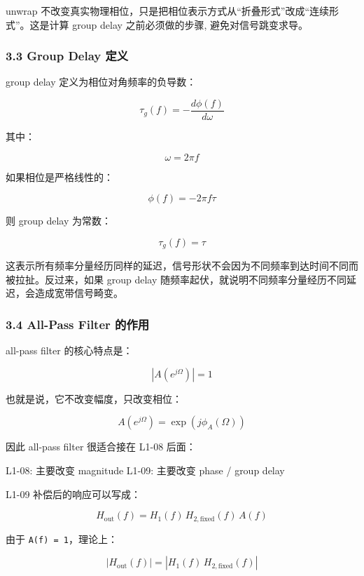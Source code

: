 \documentclass[
]{ctexart}
\newenvironment{Shaded}{}{}
\newcommand{\NormalTok}[1]{#1}
\begin{document}
unwrap
不改变真实物理相位，只是把相位表示方式从``折叠形式''改成``连续形式''。这是计算
group delay 之前必须做的步骤, 避免对信号跳变求导。

\subsubsection{3.3 Group Delay 定义}\label{group-delay-ux5b9aux4e49}

group delay 定义为相位对角频率的负导数：

\[
\tau_g(f)=-\frac{d\phi(f)}{d\omega}
\]

其中：

\[
\omega=2\pi f
\]

如果相位是严格线性的：

\[
\phi(f)=-2\pi f\tau
\]

则 group delay 为常数：

\[
\tau_g(f)=\tau
\]

这表示所有频率分量经历同样的延迟，信号形状不会因为不同频率到达时间不同而被拉扯。反过来，如果
group delay
随频率起伏，就说明不同频率分量经历不同延迟，会造成宽带信号畸变。

\subsubsection{3.4 All-Pass Filter
的作用}\label{all-pass-filter-ux7684ux4f5cux7528}

all-pass filter 的核心特点是：

\[
\left|A\!\left(e^{j\Omega}\right)\right|=1
\]

也就是说，它不改变幅度，只改变相位：

\[
A\!\left(e^{j\Omega}\right)=\exp\!\left(j\phi_A(\Omega)\right)
\]

因此 all-pass filter 很适合接在 L1-08 后面：

\begin{Shaded}
\begin{Highlighting}[]
\NormalTok{L1{-}08: 主要改变 magnitude}
\NormalTok{L1{-}09: 主要改变 phase / group delay}
\end{Highlighting}
\end{Shaded}

L1-09 补偿后的响应可以写成：

\[
H_{\mathrm{out}}(f)=H_1(f)\,H_{2,\mathrm{fixed}}(f)\,A(f)
\]

由于 \texttt{\textbar{}A(f)\textbar{}\ =\ 1}，理论上：

\[
\left|H_{\mathrm{out}}(f)\right|=\left|H_1(f)\,H_{2,\mathrm{fixed}}(f)\right|
\]
\end{document}
